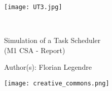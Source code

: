 \documentclass[a4paper, french]{report}
\begin{document}
\begin{titlepage}
    \begin{flushleft}
        \texttt{[image: UT3.jpg]}\par
        \centering
        
        \vspace{13\baselineskip}       
        \HRule \\[0.4cm]

        {\Huge 
        Simulation of a Task Scheduler\\ (M1 CSA - Report)\par}
        \vspace{0.4cm}
        \HRule
        \vfill
      
        Author(s): Florian Legendre\medskip \par
        
        \texttt{[image: creative\_commons.png]}\par
    \end{flushleft}
\end{titlepage}


\newpage
\pagestyle{empty}
\tableofcontents
{}
\pagestyle{plain}

\newpage







\end{document}

